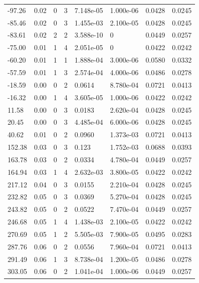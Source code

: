 \documentclass[preview]{standalone}
\begin{document}
{{\begin{tabular}{L{1.2cm}C{1.2cm} C{0.3cm}C{0.5cm} C{1.4cm}C{1.4cm} C{1.4cm}C{1.4cm}}
  -97.26  &  0.02  & 0     &  3 &  7.148e-05  & 1.000e-06  & 0.0428 &  0.0245   \\ 
  -85.46  &  0.02  & 0     &  3 &  1.455e-03  & 2.100e-05  & 0.0428 &  0.0245   \\ 
  -83.61  &  0.02  & 2     &  2 &  3.588e-10  & 0  & 0.0449 &  0.0257   \\ 
  -75.00  &  0.01  & 1     &  4 &  2.051e-05  & 0  & 0.0422 &  0.0242   \\ 
  -60.20  &  0.01  & 1     &  1 &  1.888e-04  & 3.000e-06  & 0.0580 &  0.0332   \\ 
  -57.59  &  0.01  & 1     &  3 &  2.574e-04  & 4.000e-06  & 0.0486 &  0.0278   \\ 
  -18.59  &  0.00  & 0     &  2 &  0.0614  & 8.780e-04  & 0.0721 &  0.0413   \\ 
  -16.32  &  0.00  & 1     &  4 &  3.605e-05  & 1.000e-06  & 0.0422 &  0.0242   \\ 
  11.58  &  0.00  & 0     &  3 &  0.0183  & 2.620e-04  & 0.0428 &  0.0245   \\ 
  20.45  &  0.00  & 0     &  3 &  4.485e-04  & 6.000e-06  & 0.0428 &  0.0245   \\ 
  40.62  &  0.01  & 0     &  2 &  0.0960  & 1.373e-03  & 0.0721 &  0.0413   \\ 
  152.38  &  0.03  & 0     &  3 &  0.123  & 1.752e-03  & 0.0688 &  0.0393   \\ 
  163.78  &  0.03  & 0     &  2 &  0.0334  & 4.780e-04  & 0.0449 &  0.0257   \\ 
  164.94  &  0.03  & 1     &  4 &  2.632e-03  & 3.800e-05  & 0.0422 &  0.0242   \\ 
  217.12  &  0.04  & 0     &  3 &  0.0155  & 2.210e-04  & 0.0428 &  0.0245   \\ 
  232.82  &  0.05  & 0     &  3 &  0.0369  & 5.270e-04  & 0.0428 &  0.0245   \\ 
  243.82  &  0.05  & 0     &  2 &  0.0522  & 7.470e-04  & 0.0449 &  0.0257   \\ 
  246.68  &  0.05  & 1     &  4 &  1.438e-03  & 2.100e-05  & 0.0422 &  0.0242   \\ 
  270.69  &  0.05  & 1     &  2 &  5.505e-03  & 7.900e-05  & 0.0495 &  0.0283   \\ 
  287.76  &  0.06  & 0     &  2 &  0.0556  & 7.960e-04  & 0.0721 &  0.0413   \\ 
  291.49  &  0.06  & 1     &  3 &  8.738e-04  & 1.200e-05  & 0.0486 &  0.0278   \\ 
  303.05  &  0.06  & 0     &  2 &  1.041e-04  & 1.000e-06  & 0.0449 &  0.0257   \\ 

\end{tabular}}}
\end{document}
